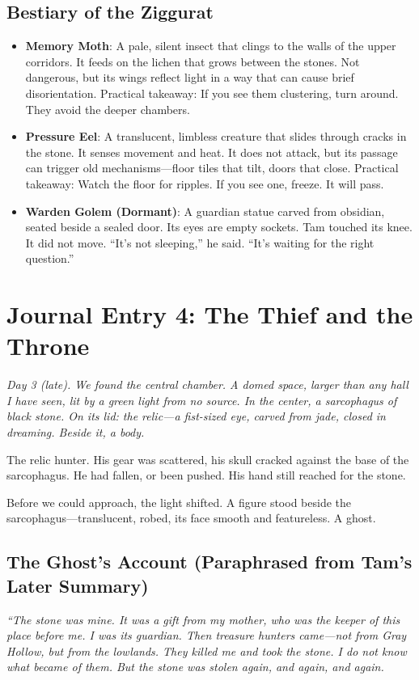 \documentclass[11pt]{article}
\begin{document}
\subsection*{Bestiary of the Ziggurat}
\begin{itemize}
    \item \textbf{Memory Moth}: A pale, silent insect that clings to the walls of the upper corridors. It feeds on the lichen that grows between the stones. Not dangerous, but its wings reflect light in a way that can cause brief disorientation. Practical takeaway: If you see them clustering, turn around. They avoid the deeper chambers.
    \item \textbf{Pressure Eel}: A translucent, limbless creature that slides through cracks in the stone. It senses movement and heat. It does not attack, but its passage can trigger old mechanisms---floor tiles that tilt, doors that close. Practical takeaway: Watch the floor for ripples. If you see one, freeze. It will pass.
    \item \textbf{Warden Golem (Dormant)}: A guardian statue carved from obsidian, seated beside a sealed door. Its eyes are empty sockets. Tam touched its knee. It did not move. ``It's not sleeping,'' he said. ``It's waiting for the right question.''
\end{itemize}

\section*{Journal Entry 4: The Thief and the Throne}
\textit{Day 3 (late). We found the central chamber. A domed space, larger than any hall I have seen, lit by a green light from no source. In the center, a sarcophagus of black stone. On its lid: the relic---a fist-sized eye, carved from jade, closed in dreaming. Beside it, a body.}

The relic hunter. His gear was scattered, his skull cracked against the base of the sarcophagus. He had fallen, or been pushed. His hand still reached for the stone.

Before we could approach, the light shifted. A figure stood beside the sarcophagus---translucent, robed, its face smooth and featureless. A ghost.

\subsection*{The Ghost's Account (Paraphrased from Tam's Later Summary)}
\textit{``The stone was mine. It was a gift from my mother, who was the keeper of this place before me. I was its guardian. Then treasure hunters came---not from Gray Hollow, but from the lowlands. They killed me and took the stone. I do not know what became of them. But the stone was stolen again, and again, and again.}
\end{document}
